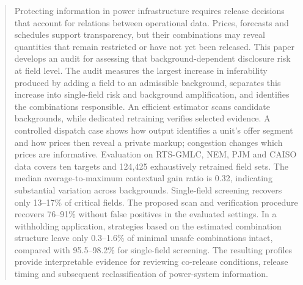 \begin{abstract}
Protecting information in power infrastructure requires release decisions that account for relations between operational data. Prices, forecasts and schedules support transparency, but their combinations may reveal quantities that remain restricted or have not yet been released. This paper develops an audit for assessing that background-dependent disclosure risk at field level. The audit measures the largest increase in inferability produced by adding a field to an admissible background, separates this increase into single-field risk and background amplification, and identifies the combinations responsible. An efficient estimator scans candidate backgrounds, while dedicated retraining verifies selected evidence. A controlled dispatch case shows how output identifies a unit's offer segment and how prices then reveal a private markup; congestion changes which prices are informative. Evaluation on RTS-GMLC, NEM, PJM and CAISO data covers ten targets and 124,425 exhaustively retrained field sets. The median average-to-maximum contextual gain ratio is 0.32, indicating substantial variation across backgrounds. Single-field screening recovers only 13--17\% of critical fields. The proposed scan and verification procedure recovers 76--91\% without false positives in the evaluated settings. In a withholding application, strategies based on the estimated combination structure leave only 0.3--1.6\% of minimal unsafe combinations intact, compared with 95.5--98.2\% for single-field screening. The resulting profiles provide interpretable evidence for reviewing co-release conditions, release timing and subsequent reclassification of power-system information.
\end{abstract}

